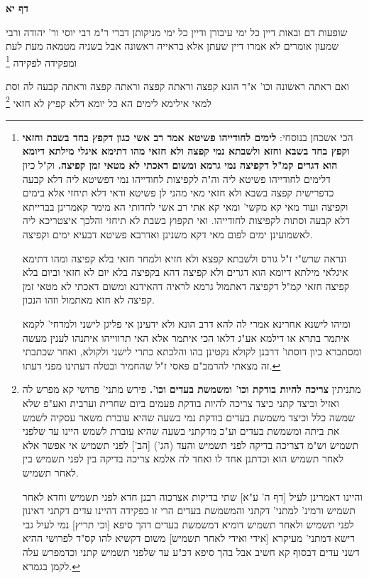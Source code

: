 \documentclass[12pt, openany]{book}
\newcommand{\sethebfont}{
\fontsize{10.5pt}{21.0pt} \selectfont
}
\newcommand{\twocol}[1]{
	{\sethebfont \begin{multicols}{2}
			#1
	\end{multicols}}	
}
\newcommand{\sectname}{}
\newcommand{\newsection}[1]{
	\addcontentsline{toc}{section}{#1}
	\renewcommand{\sectname}{#1}	
	\vspace{-\baselineskip}
	\begin{center}
		\textbf{%
\fontsize{16pt}{16pt}\selectfont
			#1}
	\end{center}
	\vspace{-\baselineskip}
	\nopagebreak
}
\newcommand{\footnotecomment}[1]{\footnote{#1}}
\newcommand{\commenta}[1]{\footnotecomment{#1}}
\begin{document}
\newsection{דף יא}
\twocol{שופעות דם ובאות דיין כל ימי עיבורן ודיין כל ימי מניקותן דברי ר"מ  רבי יוסי ור' יהודה ורבי שמעון אומרים  לא אמרו דיין שעתן אלא בראייה ראשונה אבל בשניה מטמאה מעת לעת ומפקידה לפקידה
\commenta{ הכי אשכחן בנוסחי: \textbf{לימים לחודייהו פשיטא אמר רב אשי כגון דקפץ בחד בשבת וחזאי וקפץ בחד בשבא וחזא ולשבתא נמי קפצה ולא חזאי מהו דתימא איגלי מילתא דיומא הוא דגרים קמ"ל דקפיצה נמי גרמא ומשום דאכתי לא מטאי זמן קפיצה.}  וק"ל כיון דלימים לחודייהו פשיטא ליה וה"ה לקפיצות לחודייהו נמי דפשיטא ליה דלא קבעה כדפרישית קפצה בשבא ולא חזאי מאי מהני לן פשיטא ודאי דלא תיחזי אלא בימים וקפיצה ועוד מאי קא מקשי' ומאי קא אתי רב אשי לחדותי הא מימר קאמרינן בברייתא דלא קבעה וסתות לקפיצות לחודייהו. ואי תקפוץ בשבת לא תיחזי והלכך איצטריכא ליה לאשמועינן ימים לפום מאי דקא משנינן ואדרבא פשיטא דבעיא ימים וקפיצה.\par  ונראה שרש"י ז"ל גורס ולשבתא קפצא ולא חזיא ולמחר חזאי בלא קפיצה ומהו דתימא איגלאי מילתא דיומא הוא דגרים ולא קפיצה דהא בקפיצה בלא יום לא חזאי וביום בלא קפיצה חזאי קמ"ל דקפיצה דאתמול גרמא לראיה דהאידנא ומשום דאכתי לא מטאי זמן קפיצה לא חזא מאתמול וזהו הנכון.\par  ומיהו לישנא אחרינא אמרי לה להא דרב הונא ולא ידעינן אי פליגן לישני ולמדחי' לקמא איתמר בתרא או דילמא אע"ג דלאו הכי איתמר אלא האי תרווייהו איתנהו לענין מעשה ומסתברא כיון דוסתו' דרבנן לקולא נקטינן בהו והלכתא כתרי לישני ולקולא, ואחר שכתבתי זה מצאתי להרמב"ם פאסי ז"ל שהחמיר ובטלה דעתינו מפני דעתו. }

ואם ראתה ראשונה וכו' א"ר הונא  קפצה וראתה קפצה וראתה קפצה וראתה קבעה לה וסת  למאי  אילימא לימים הא כל יומא דלא קפיץ לא חזאי 
\commenta{ מתניתין \textbf{צריכה להיות בודקת וכו' ומשמשת בעדים וכו'.}  פירש מתני' פרושי קא מפרש לה ואזיל וכיצד קתני כיצד צריכה להיות בודקת פעמים ביום שחרית וערבית ואע"פ שלא שמשה כלל וכיצד משמשת בעדים בודקת נמי בשעה שהיא עוברת משאר עסקיה לשמש את ביתה ומשמשת בעדים וע"כ מדקתני בשעה שהיא עוברת לשמש היינו עד שלפני תשמיש וש"מ דצריכה בדיקה לפני תשמיש והעד (הג') [הב'] לפני תשמיש אי אפשר אלא לאחר תשמיש הוא וכדתנן אחד לו ואחד לה אלמא צריכה בדיקה בין לפני תשמיש בין לאחר תשמיש.\par  והיינו דאמרינן לעיל [דף ה' ע"א] שתי בדיקות אצרכוה רבנן חדא לפני תשמיש וחדא לאחר תשמיש ורמינ' למתני' דקתני והמשמשת בעדים הרי זו כפקידה דהיינו עדים דקתני דאינון לפני תשמיש ולאחר תשמיש דומיא דמשמשת בעדים דהך סיפא [וכי תריץ] נמי לעיל גבי רישא דמתני' מעיקרא [אידי ואידי לאחר תשמיש] משום דקשיא להו קס"ד לפרושי ההיא דשני עדים דבסוף קא חשיב אבל בהך סיפא דכ"ע עד שלפני תשמיש קתני וכדמפרש עלה לקמן בגמרא. }

}
\end{document}
